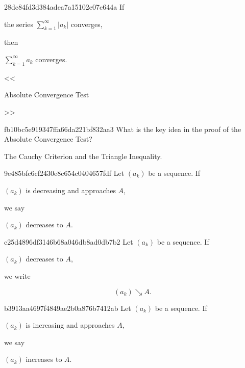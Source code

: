 \begin{note}{28dc84fd3d384adea7a15102e07c644a}
    If \begin{icloze}{2}the series \({ \sum_{k=1}^{\infty} \left\lvert a_k \right\rvert }\) converges,\end{icloze} then \begin{icloze}{1}\({ \sum_{k=1}^{\infty} a_k }\) converges.\end{icloze}

    \begin{center}
        \tiny
        <<\begin{icloze}{3}Absolute Convergence Test\end{icloze}>>
    \end{center}
\end{note}

\begin{note}{fb10bc5e919347ffa66da221bf832aa3}
    What is the key idea in the proof of the Absolute Convergence Test?

    \begin{cloze}{1}
        The Cauchy Criterion and the Triangle Inequality.
    \end{cloze}
\end{note}

\begin{note}{9e485bfc6cf2430e8c654c0404657fdf}
    Let \({ (a_k) }\) be a sequence.
    If \begin{icloze}{2}\({ (a_k) }\) is decreasing and approaches \({ A }\),\end{icloze} we say \begin{icloze}{1}\({ (a_k) }\) decreases to \({ A }\).\end{icloze}
\end{note}

\begin{note}{c25d4896df3146b68a046db8ad0db7b2}
    Let \({ (a_k) }\) be a sequence.
    If \begin{icloze}{2}\({ (a_k) }\) decreases to \({ A }\),\end{icloze} we write
    \begin{icloze}{1}
        \[
            (a_k) \searrow A.
        \]
    \end{icloze}
\end{note}

\begin{note}{b3913aa4697f4849ae2b0a876b7412ab}
    Let \({ (a_k) }\) be a sequence.
    If \begin{icloze}{2}\({ (a_k) }\) is increasing and approaches \({ A }\),\end{icloze} we say \begin{icloze}{1}\({ (a_k) }\) increases to \({ A }\).\end{icloze}
\end{note}

